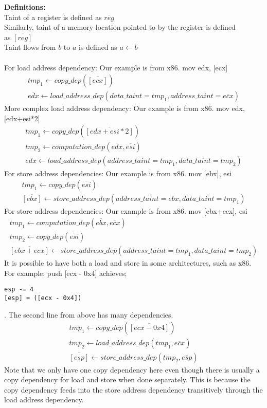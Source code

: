 \documentclass{article}
\begin{document}
{\bf Definitions:}\\
Taint of a register is defined as $\overline{reg}$\\
Similarly, taint of a memory location pointed to by the register is defined\\
as $\overline{[reg]}$ \\
Taint flows from $b$ to $a$ is defined as $a\leftarrow{b}$
\\\\
For load address dependency:
Our example is from x86. mov edx, [ecx]
\begin{align*}
        tmp_1 \leftarrow copy\_dep(\overline{[ecx]})\\
        \overline{edx} \leftarrow load\_address\_dep(data\_taint=tmp_1, address\_taint=\overline{ecx})
\end{align*}
More complex load address dependency:
Our example is from x86. mov edx, [edx+esi*2]
\begin{align*}
        tmp_1 \leftarrow copy\_dep(\overline{[edx+esi*2]})\\
tmp_2 \leftarrow computation\_dep(\overline{edx},\overline{esi}) \\
        \overline{edx} \leftarrow load\_address\_dep(address\_taint=tmp_1,data\_taint=tmp_2)
\end{align*}
For store address dependencies:
Our example is from x86. mov [ebx], esi
\begin{align*}
        tmp_1 \leftarrow copy\_dep(\overline{esi})\\
        \overline{[ebx]} \leftarrow store\_address\_dep(address\_taint=\overline{ebx},data\_taint=tmp_1)
\end{align*}
For store address dependencies:
Our example is from x86. mov [ebx+ecx], esi
\begin{align*}
        tmp_1 \leftarrow computation\_dep(\overline{ebx},\overline{ecx})\\
        tmp_2 \leftarrow copy\_dep(\overline{esi})\\
        \overline{[ebx+ecx]} \leftarrow store\_address\_dep(address\_taint=tmp_1,data\_taint=tmp_2)
\end{align*}
It is possible to have both a load and store in some architectures,
such as x86. For example: push [ecx - 0x4] achieves;
\begin{verbatim}
esp -= 4 
[esp] = ([ecx - 0x4])
\end{verbatim}
. The second line from above has many dependencies.
\begin{align*}
        tmp_1 \leftarrow copy\_dep(\overline{[ecx-0x4]})\\
        tmp_2 \leftarrow load\_address\_dep({tmp_1,\overline{ecx}})\\
        \overline{[esp]} \leftarrow store\_address\_dep(tmp_2,\overline{esp})
\end{align*}
Note that we only have one copy dependency here even though there is usually a
copy dependency for load and store when done separately.  This is because the
copy dependency feeds into the store address dependency transitively through
the load address dependency.
\end{document}
